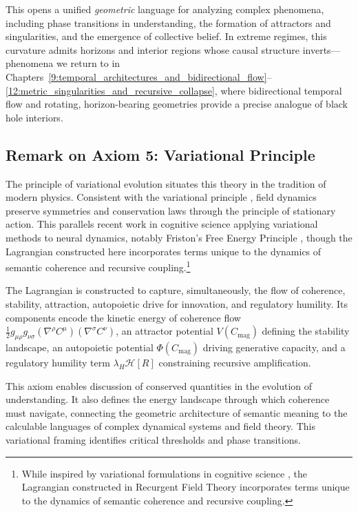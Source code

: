 This opens a unified \textit{geometric} language for analyzing complex phenomena, including phase transitions in understanding, the formation of attractors and singularities, and the emergence of collective belief. In extreme regimes, this curvature admits horizons and interior regions whose causal structure inverts—phenomena we return to in Chapters~\ref{9:temporal_architectures_and_bidirectional_flow}--\ref{12:metric_singularities_and_recursive_collapse}, where bidirectional temporal flow and rotating, horizon-bearing geometries provide a precise analogue of black hole interiors.


\subsection{Remark on Axiom 5: Variational Principle}
\label{1.3.5:remark_1_5}

The principle of variational evolution situates this theory in the tradition of modern physics. Consistent with the variational principle \autocite{GoldsteinPooleSafko2002, Arnold1989}, field dynamics preserve symmetries and conservation laws through the principle of stationary action. This parallels recent work in cognitive science applying variational methods to neural dynamics, notably Friston's Free Energy Principle \autocite{Friston2010, Parr2022}, though the Lagrangian constructed here incorporates terms unique to the dynamics of semantic coherence and recursive coupling.\footnote{While inspired by variational formulations in cognitive science \autocite{Friston2010, Parr2022}, the Lagrangian constructed in Recurgent Field Theory incorporates terms unique to the dynamics of semantic coherence and recursive coupling.}

The Lagrangian is constructed to capture, simultaneously, the flow of coherence, stability, attraction, autopoietic drive for innovation, and regulatory humility. Its components encode the kinetic energy of coherence flow \(\frac{1}{2} g_{\mu\rho} g_{\nu\sigma} (\nabla^\rho C^\mu)(\nabla^\sigma C^\nu)\), an attractor potential \(V(C_{\text{mag}})\) defining the stability landscape, an autopoietic potential \(\Phi(C_{\text{mag}})\) driving generative capacity, and a regulatory humility term \(\lambda_H \mathcal{H}[R]\) constraining recursive amplification.

This axiom enables discussion of conserved quantities in the evolution of understanding. It also defines the energy landscape through which coherence must navigate, connecting the geometric architecture of semantic meaning to the calculable languages of complex dynamical systems and field theory. This variational framing identifies critical thresholds and phase transitions.

